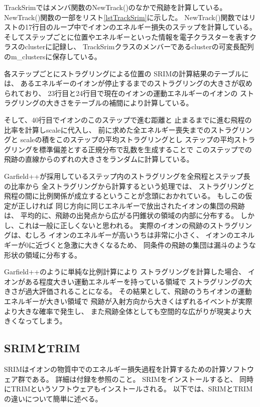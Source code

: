 \documentclass [11pt,a4paper,dvipdfmx] {jarticle}
\begin{document}
TrackSrimではメンバ関数のNewTrack()のなかで飛跡を計算している。
NewTrack()関数の一部をリスト\ref{lstTrackSrim}に示した。
NewTrack()関数ではリストの17行目のループ中でイオンのエネルギー損失のステップを計算している。
そしてステップごとに位置やエネルギーといった情報を電子クラスターを表すクラスのclusterに記録し、
TrackSrimクラスのメンバーであるclusterの可変長配列のm\_clustersに保存している。

各ステップごとにストラグリングによる位置の
SRIMの計算結果のテーブルには、
あるエネルギーのイオンが停止するまでのストラグリングの大きさが収められており、
23行目と24行目で現在のイオンの運動エネルギーのイオンの
ストラグリングの大きさをテーブルの補間により計算している。

そして、40行目でイオンのこのステップで進む距離と
止まるまでに進む飛程の比率を計算しscaleに代入し、
前に求めた全エネルギー喪失までのストラグリングと
scaleの積をこのステップの平均ストラグリングとし
ステップの平均ストラグリングを標準偏差とする正規分布で乱数を生成することで
このステップでの飛跡の直線からのずれの大きさをランダムに計算している。

Garfield++が採用しているステップ内のストラグリングを全飛程とステップ長の比率から
全ストラグリングから計算するという処理では、
ストラグリングと飛程の間に比例関係が成立するということが念頭におかれている。
もしこの仮定が正しければ
同じ方向に同じエネルギーで放出されたイオンの集団の飛跡は、
平均的に、飛跡の出発点から広がる円錐状の領域の内部に分布する。
しかし、これは一般に正しくないと思われる。
実際のイオンの飛跡のストラグリングは、むしろ
イオンのエネルギーが高いうちは非常に小さく、
イオンのエネルギーが0に近づくと急激に大きくなるため、
同条件の飛跡の集団は漏斗のような形状の領域に分布する。

Garfield++のように単純な比例計算により
ストラグリングを計算した場合、
イオンがある程度大きい運動エネルギーを持っている領域で
ストラグリングの大きさが過大評価されることになる。
その結果として、飛跡のうちイオンの運動エネルギーが大きい領域で
飛跡が入射方向から大きくはずれるイベントが実際より大きな確率で発生し、
また飛跡全体としても空間的な広がりが現実より大きくなってしまう。


\subsection{SRIMとTRIM}
SRIMはイオンの物質中でのエネルギー損失過程を計算するための計算ソフトウェア群である。
詳細は付録を参照のこと。
SRIMをインストールすると、
同時にTRIMというソフトウェアもインストールされる。
以下では、SRIMとTRIMの違いについて簡単に述べる。
\end{document}
